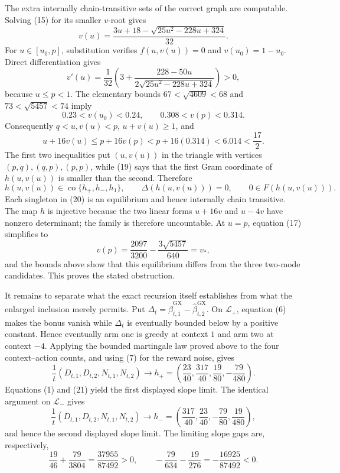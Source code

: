 The extra internally chain-transitive sets of the correct graph are computable.  Solving (15) for its smaller \(v\)-root gives
\[
 v(u)=\frac{3u+18-\sqrt{25u^2-228u+324}}{32}. \tag{17}
\]
For \(u\in[u_0,p]\), substitution verifies \(f(u,v(u))=0\) and \(v(u_0)=1-u_0\).  Direct differentiation gives
\[
 v'(u)=\frac1{32}\left(3+\frac{228-50u}{2\sqrt{25u^2-228u+324}}\right)>0, \tag{18}
\]
because \(u\leq p<1\).  The elementary bounds \(67<\sqrt{4609}<68\) and \(73<\sqrt{5457}<74\) imply
\[
 0.23<v(u_0)<0.24,\qquad 0.308<v(p)<0.314.
\]
Consequently \(q<u,v(u)<p\), \(u+v(u)\geq1\), and
\[
 u+16v(u)\leq p+16v(p)<p+16(0.314)<6.014<\frac{17}{2}. \tag{19}
\]
The first two inequalities put \((u,v(u))\) in the triangle with vertices \((p,q),(q,p),(p,p)\), while (19) says that the first Gram coordinate of \(h(u,v(u))\) is smaller than the second.  Therefore
\[
 h(u,v(u))\in\operatorname{co}\{h_+,h_-,h_1\},\qquad
 \Delta(h(u,v(u)))=0,\qquad 0\in F(h(u,v(u))). \tag{20}
\]
Each singleton in (20) is an equilibrium and hence internally chain transitive.  The map \(h\) is injective because the two linear forms \(u+16v\) and \(u-4v\) have nonzero determinant; the family is therefore uncountable.  At \(u=p\), equation (17) simplifies to
\[
 v(p)=\frac{2097}{3200}-\frac{3\sqrt{5457}}{640}=v_*,
\]
and the bounds above show that this equilibrium differs from the three two-mode candidates.  This proves the stated obstruction.

It remains to separate what the exact recursion itself establishes from what the enlarged inclusion merely permits.  Put \(\Delta_t=\widehat\beta^{\mathrm{GX}}_{t,1}-\widehat\beta^{\mathrm{GX}}_{t,2}\).  On \(\mathcal L_+\), equation (6) makes the bonus vanish while \(\Delta_t\) is eventually bounded below by a positive constant.  Hence eventually arm one is greedy at context \(1\) and arm two at context \(-4\).  Applying the bounded martingale law proved above to the four context--action counts, and using (7) for the reward noise, gives
\[
 \frac1t(D_{t,1},D_{t,2},N_{t,1},N_{t,2})
 \longrightarrow h_+=\left(\frac{23}{40},\frac{317}{40},\frac{19}{80},-\frac{79}{480}\right). \tag{21}
\]
Equations (1) and (21) yield the first displayed slope limit.  The identical argument on \(\mathcal L_-\) gives
\[
 \frac1t(D_{t,1},D_{t,2},N_{t,1},N_{t,2})
 \longrightarrow h_-=\left(\frac{317}{40},\frac{23}{40},-\frac{79}{80},\frac{19}{480}\right), \tag{22}
\]
and hence the second displayed slope limit.  The limiting slope gaps are, respectively,
\[
 \frac{19}{46}+\frac{79}{3804}=
 \frac{37955}{87492}>0,
 \qquad
 -\frac{79}{634}-\frac{19}{276}=-\frac{16925}{87492}<0. \tag{23}
\]

